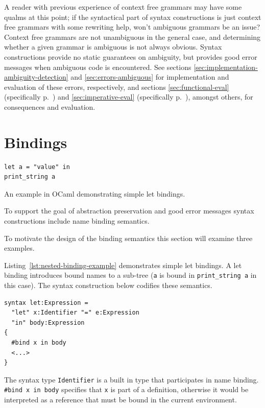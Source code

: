 \documentclass{kththesis}
\begin{document}
A reader with previous experience of context free grammars may have some qualms at this point; if the syntactical part of syntax constructions is just context free grammars with some rewriting help, won't ambiguous grammars be an issue? Context free grammars are not unambiguous in the general case, and determining whether a given grammar is ambiguous is not always obvious. Syntax constructions provide no static guarantees on ambiguity, but provides good error messages when ambiguous code is encountered. See sections \ref{sec:implementation-ambiguity-detection} and \ref{sec:errors-ambiguous} for implementation and evaluation of these errors, respectively, and sections \ref{sec:functional-eval} (specifically p.~\pageref{sec:ambiguous-lists}) and \ref{sec:imperative-eval} (specifically p.~\pageref{sec:lua-func-call-precedence}), amongst others, for consequences and evaluation.

\section{Bindings} \label{sec:design-bindings}

\begin{listing}[h]
\begin{verbatim}
let a = "value" in
print_string a
\end{verbatim}
\caption{An example in OCaml demonstrating simple let bindings.}
\label{lst:nested-binding-example}
\end{listing}

To support the goal of abstraction preservation and good error messages syntax constructions include name binding semantics.

To motivate the design of the binding semantics this section will examine three examples.

Listing~\ref{lst:nested-binding-example} demonstrates simple let bindings. A let binding introduces bound names to a sub-tree (\texttt{a} is bound in \texttt{print_string a} in this case). The syntax construction below codifies these semantics.

\begin{verbatim}
syntax let:Expression =
  "let" x:Identifier "=" e:Expression
  "in" body:Expression
{
  #bind x in body
  <...>
}
\end{verbatim}

The syntax type \texttt{Identifier} is a built in type that participates in name binding. \texttt{#bind x in body} specifies that \texttt{x} is part of a definition, otherwise it would be interpreted as a reference that must be bound in the current environment.
\end{document}
